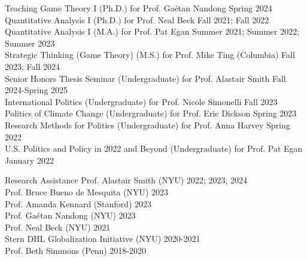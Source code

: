 \documentclass{resume} %
\begin{document}
\newpage

\begin{rSection}{Teaching}
Game Theory I (Ph.D.) for Prof. Ga\'etan Nandong \hfill Spring 2024\\
Quantitative Analysis I (Ph.D.) for Prof. Neal Beck \hfill Fall 2021; Fall 2022\\
Quantitative Analysis I (M.A.) for Prof. Pat Egan \hfill Summer 2021; Summer 2022; Summer 2023\\
Strategic Thinking (Game Theory) (M.S.) for Prof. Mike Ting (Columbia) \hfill Fall 2023; Fall 2024\\
Senior Honors Thesis Seminar (Undergraduate) for Prof. Alastair Smith \hfill Fall 2024-Spring 2025\\
International Politics (Undergraduate) for Prof. Nicole Simonelli \hfill Fall 2023\\
Politics of Climate Change (Undergraduate) for Prof. Eric Dickson \hfill Spring 2023\\
Research Methods for Politics (Undergraduate) for Prof. Anna Harvey \hfill Spring 2022\\
U.S. Politics and Policy in 2022 and Beyond (Undergraduate) for Prof. Pat Egan \hfill January 2022
\end{rSection}

\begin{rSection}{Research Assistance}
    Prof. Alastair Smith (NYU) \hfill 2022; 2023; 2024\\
    Prof. Bruce Bueno de Mesquita (NYU) \hfill 2023\\
    Prof. Amanda Kennard (Stanford) \hfill 2023\\
    Prof. Ga\'etan Nandong (NYU) \hfill 2023\\
    Prof. Neal Beck (NYU) \hfill 2021\\
    Stern DHL Globalization Initiative (NYU) \hfill 2020-2021\\
    Prof. Beth Simmons (Penn) \hfill 2018-2020
\end{rSection}
\end{document}
